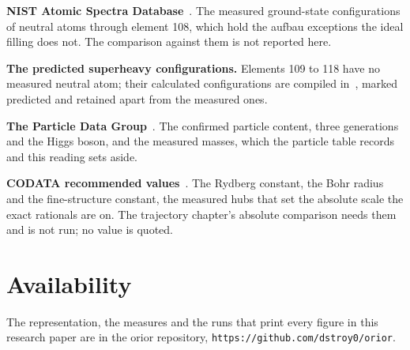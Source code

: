 \textbf{NIST Atomic Spectra Database}~\cite{src:NIST-Atomic-Spectra-Database}. The measured
ground-state configurations of neutral atoms through element 108, which hold the aufbau exceptions the
ideal filling does not. The comparison against them is not reported here.

\textbf{The predicted superheavy configurations.} Elements 109 to 118 have no measured neutral atom;
their calculated configurations are compiled
in~\cite{src:Wikipedia-Electron-configurations-of-the-elements-data-page}, marked predicted and retained
apart from the measured ones.

\textbf{The Particle Data Group}~\cite{src:Particle-Data-Group}. The confirmed particle content, three
generations and the Higgs boson, and the measured masses, which the particle table records and this
reading sets aside.

\textbf{CODATA recommended values}~\cite{src:Mohr-et-al-2025}. The Rydberg constant, the Bohr radius
and the fine-structure constant, the measured hubs that set the absolute scale the exact rationals
are on. The trajectory chapter's absolute comparison needs them and is not run; no value is quoted.

\section*{Availability}

The representation, the measures and the runs that print every figure in this research paper are in
the orior repository, \texttt{https://github.com/dstroy0/orior}.

